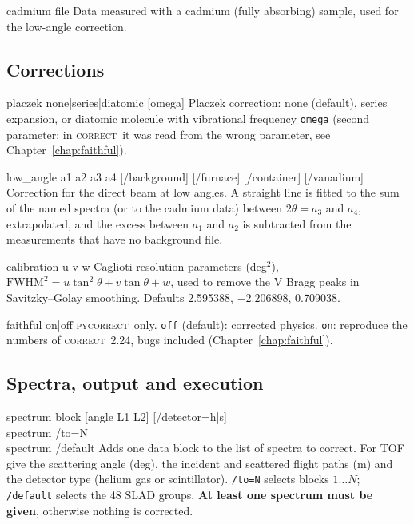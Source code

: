 \documentclass[11pt,a4paper]{report}
\newcommand{\code}[1]{\texttt{#1}}
\newcommand{\pyc}{\textsc{pycorrect}}
\newcommand{\cor}{\textsc{correct}}
\begin{document}
\begin{cmdbox}{cadmium  file}
Data measured with a cadmium (fully absorbing) sample, used for the low-angle
correction.
\end{cmdbox}

\subsection{Corrections}

\begin{cmdbox}{placzek  none|series|diatomic  [omega]}
Placzek correction: none (default), series expansion, or diatomic molecule with
vibrational frequency \code{omega} (second parameter; in \cor\ it was read from the
wrong parameter, see Chapter~\ref{chap:faithful}).
\end{cmdbox}

\begin{cmdbox}{low\_angle  a1 a2 a3 a4  [/background] [/furnace] [/container] [/vanadium]}
Correction for the direct beam at low angles. A straight line is fitted to the
sum of the named spectra (or to the cadmium data) between $2\theta = a_3$ and
$a_4$, extrapolated, and the excess between $a_1$ and $a_2$ is subtracted from
the measurements that have no background file.
\end{cmdbox}

\begin{cmdbox}{calibration  u  v  w}
Caglioti resolution parameters (deg$^2$),
$\mathrm{FWHM}^2 = u\tan^2\theta + v\tan\theta + w$, used to remove the V Bragg
peaks in Savitzky--Golay smoothing. Defaults 2.595388, $-2.206898$, 0.709038.
\end{cmdbox}

\begin{cmdbox}{faithful  on|off}
\pyc\ only. \code{off} (default): corrected physics. \code{on}: reproduce the
numbers of \cor\ 2.24, bugs included (Chapter~\ref{chap:faithful}).
\end{cmdbox}

\subsection{Spectra, output and execution}

\begin{cmdbox}{spectrum  block  [angle  L1  L2]  [/detector=h|s]\\ spectrum  /to=N\\ spectrum  /default}
Adds one data block to the list of spectra to correct. For TOF give the
scattering angle (deg), the incident and scattered flight paths (m) and the
detector type (helium gas or scintillator). \code{/to=N} selects blocks
$1\ldots N$; \code{/default} selects the 48 SLAD groups. \textbf{At least one
spectrum must be given}, otherwise nothing is corrected.
\end{cmdbox}
\end{document}
